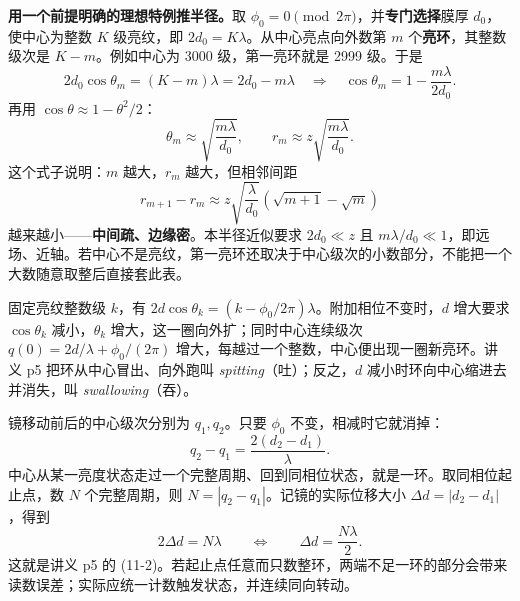 \documentclass[11pt]{ctexart}
\begin{document}
\textbf{用一个前提明确的理想特例推半径。}取 \(\phi_0=0\pmod{2\pi}\)，并\textbf{专门选择}膜厚 \(d_0\)，使中心为整数 \(K\) 级亮纹，即 \(2d_0=K\lambda\)。从中心亮点向外数第 \(m\) 个\textbf{亮环}，其整数级次是 \(K-m\)。例如中心为 3000 级，第一亮环就是 2999 级。于是
\[
2d_0\cos\theta_m=(K-m)\lambda=2d_0-m\lambda
\quad\Longrightarrow\quad
\cos\theta_m=1-\frac{m\lambda}{2d_0}.
\]
再用 \(\cos\theta\approx1-\theta^2/2\)：
\[
\theta_m\approx\sqrt{\frac{m\lambda}{d_0}},
\qquad
r_m\approx z\sqrt{\frac{m\lambda}{d_0}} .
\]
这个式子说明：\(m\) 越大，\(r_m\) 越大，但相邻间距
\[
r_{m+1}-r_m\approx z\sqrt{\frac{\lambda}{d_0}}\left(\sqrt{m+1}-\sqrt{m}\right)
\]
越来越小——\textbf{中间疏、边缘密}。本半径近似要求 \(2d_0\ll z\) 且 \(m\lambda/d_0\ll1\)，即远场、近轴。若中心不是亮纹，第一亮环还取决于中心级次的小数部分，不能把一个大数随意取整后直接套此表。



固定亮纹整数级 \(k\)，有 \(2d\cos\theta_k=(k-\phi_0/2\pi)\lambda\)。附加相位不变时，\(d\) 增大要求 \(\cos\theta_k\) 减小，\(\theta_k\) 增大，这一圈向外扩；同时中心连续级次 \(q(0)=2d/\lambda+\phi_0/(2\pi)\) 增大，每越过一个整数，中心便出现一圈新亮环。讲义 p5 把环从中心冒出、向外跑叫 \textit{spitting}（吐）；反之，\(d\) 减小时环向中心缩进去并消失，叫 \textit{swallowing}（吞）。

镜移动前后的中心级次分别为 \(q_1,q_2\)。只要 \(\phi_0\) 不变，相减时它就消掉：
\[
q_2-q_1=\frac{2(d_2-d_1)}{\lambda}.
\]
中心从某一亮度状态走过一个完整周期、回到同相位状态，就是一环。取同相位起止点，数 \(N\) 个完整周期，则 \(N=|q_2-q_1|\)。记镜的实际位移大小 \(\Delta d=|d_2-d_1|\)，得到
\begin{equation}
2\Delta d=N\lambda
\qquad\Longleftrightarrow\qquad
\Delta d=\frac{N\lambda}{2}.
\label{eq:count}
\end{equation}
这就是讲义 p5 的 (11-2)。若起止点任意而只数整环，两端不足一环的部分会带来读数误差；实际应统一计数触发状态，并连续同向转动。

\end{document}
